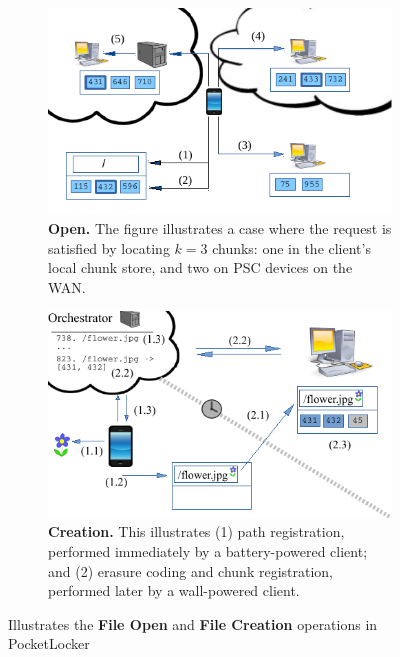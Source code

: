 \begin{figure}[t]

  \begin{subfigure}[t]{\columnwidth}

    \includegraphics[width=\columnwidth]{./figures/open.pdf}

    \caption{\small \textbf{Open.} The figure illustrates a case where the
      request is satisfied by locating $k = 3$ chunks: one in the client's
    local chunk store, and two on PSC devices on the WAN.}

    \label{fig-design-open}
  \end{subfigure}\hfill
  \begin{subfigure}[t]{\columnwidth}

    \includegraphics[width=\columnwidth]{./figures/create.pdf}

    \caption{\small \textbf{Creation.} This illustrates (1) path registration,
      performed immediately by a battery-powered client; and (2) erasure coding
    and chunk registration, performed later by a wall-powered client.}

    \label{fig-design-creation}
  \end{subfigure}
  \vspace*{0.05in}

  \caption{Illustrates the \small \textbf{File Open} and \small \textbf{File Creation} operations in PocketLocker}

  \vspace*{-0.2in}
\end{figure}


